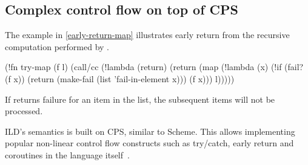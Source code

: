 \subsection{Complex control flow on top of CPS}
The example in \cref{early-return-map} illustrates early return from the
recursive computation
performed by .
\begin{listingbox}\begin{ildcode}
(!fn try-map (f l)
  (call/cc (!lambda (return)
    (return (map
      (!lambda (x)
        (!if (fail? (f x))
          (return
            (make-fail
            (list 'fail-in-element x)))
          (f x))) l)))))
\end{ildcode}\end{listingbox}
\label{early-return-map}
If  returns failure for an item in the list, the subsequent items will not
be processed.

ILD's semantics is built on CPS, similar to Scheme. This allows implementing
popular non-linear control flow constructs such as try/catch, early return
and coroutines in the language itself~\cite{r5rs}.
